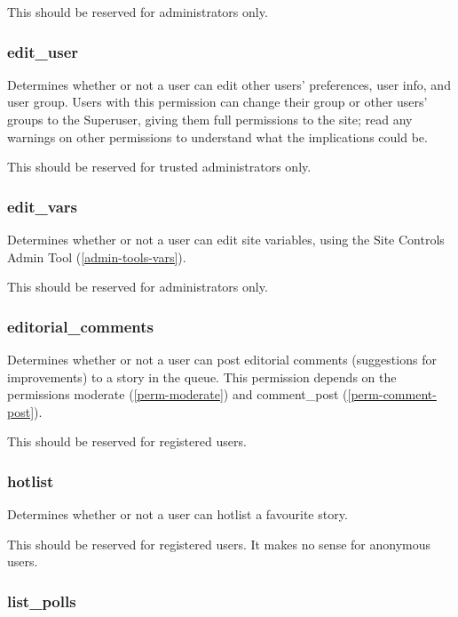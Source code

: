 This should be reserved for administrators only.

\subsubsection{edit\_user}
\label{perm-edit-user}

Determines whether or not a user can edit other users' preferences, user info, and user group.  Users with this permission can change their group or other users' groups to the Superuser, giving them full permissions to the site; read any warnings on other permissions to understand what the implications could be.

This should be reserved for trusted administrators only.

\subsubsection{edit\_vars}
\label{perm-edit-vars}

Determines whether or not a user can edit site variables, using the Site Controls Admin Tool (\ref{admin-tools-vars}).

This should be reserved for administrators only.

\subsubsection{editorial\_comments}
\label{perm-editorial-comments}

Determines whether or not a user can post editorial comments (suggestions for improvements) to a story in the queue.  This permission depends on the permissions moderate (\ref{perm-moderate}) and comment\_post (\ref{perm-comment-post}).

This should be reserved for registered users.

\subsubsection{hotlist}
\label{perm-hotlist}

Determines whether or not a user can hotlist a favourite story.

This should be reserved for registered users.  It makes no sense for anonymous users.

\subsubsection{list\_polls}
\label{perm-list-polls}


